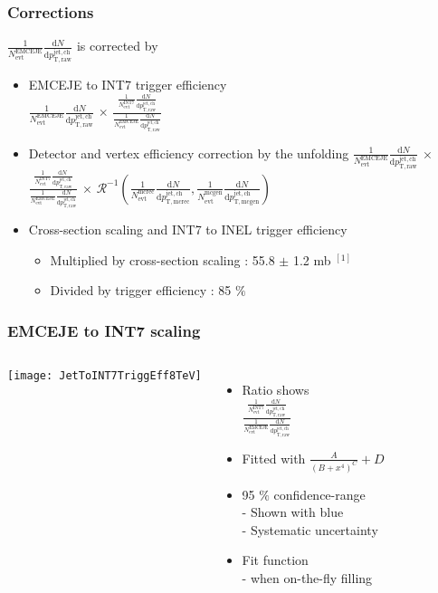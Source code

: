 \begin{frame}
\frametitle{Corrections}
$\frac{1}{N_\mathrm{evt}^\mathrm{EMCEJE}} \frac{\mathrm{d}N}{\mathrm{d}p_\mathrm{T,raw}^\mathrm{jet,ch}}$ is corrected by
\begin{itemize}
\item{EMCEJE to INT7 trigger efficiency\\
\small
$\frac{1}{N_\mathrm{evt}^\mathrm{EMCEJE}} \frac{\mathrm{d}N}{\mathrm{d}p_\mathrm{T,raw}^\mathrm{jet,ch}}$
$\times$ $\frac{\frac{1}{N_\mathrm{evt}^\mathrm{INT7}} \frac{\mathrm{d}N}{\mathrm{d}p_\mathrm{T,raw}^\mathrm{jet,ch}}}{\frac{1}{N_\mathrm{evt}^\mathrm{EMCEJE}} \frac{\mathrm{d}N}{\mathrm{d}p_\mathrm{T,raw}^\mathrm{jet,ch}}}$
\normalsize}
\item{Detector and vertex efficiency correction by the unfolding
\small
$\frac{1}{N_\mathrm{evt}^\mathrm{EMCEJE}} \frac{\mathrm{d}N}{\mathrm{d}p_\mathrm{T,raw}^\mathrm{jet,ch}}$
$\times$ $\frac{\frac{1}{N_\mathrm{evt}^\mathrm{INT7}} \frac{\mathrm{d}N}{\mathrm{d}p_\mathrm{T,raw}^\mathrm{jet,ch}}}{\frac{1}{N_\mathrm{evt}^\mathrm{EMCEJE}} \frac{\mathrm{d}N}{\mathrm{d}p_\mathrm{T,raw}^\mathrm{jet,ch}}}$
$\times$ $\mathcal{R}^{-1}(\frac{1}{N_\mathrm{evt}^\mathrm{mcrec}} \frac{\mathrm{d}N}{\mathrm{d}p_\mathrm{T,mcrec}^\mathrm{jet,ch}},\frac{1}{N_\mathrm{evt}^\mathrm{mcgen}} \frac{\mathrm{d}N}{\mathrm{d}p_\mathrm{T,mcgen}^\mathrm{jet,ch}})$
}
\normalsize
\item{Cross-section scaling and INT7 to INEL trigger efficiency}
\begin{itemize}
	\item{Multiplied by cross-section scaling : 55.8 $\pm$ 1.2 mb $^{[1]}$}
	\item{Divided by trigger efficiency : 85 $\%$}
\end{itemize}

\end{itemize}
\end{frame}

\begin{frame}
\frametitle{EMCEJE to INT7 scaling}
\begin{columns}[c]
\centering
\texttt{[image: JetToINT7TriggEff8TeV]}\\
\begin{itemize}
  \item{Ratio shows \\ $\frac{\frac{1}{N_\mathrm{evt}^\mathrm{INT7}} \frac{\mathrm{d}N}{\mathrm{d}p_\mathrm{T,raw}^\mathrm{jet,ch}}}{\frac{1}{N_\mathrm{evt}^\mathrm{EMCEJE}} \frac{\mathrm{d}N}{\mathrm{d}p_\mathrm{T,raw}^\mathrm{jet,ch}}}$}
	\item{Fitted with $\frac{A}{(B+x^4)^C}+D$}
	\item{95 $\%$ confidence-range \\- Shown with blue\\- Systematic uncertainty}
  \item{Fit function\\- when on-the-fly filling}
\end{itemize}
\end{columns}
\end{frame}


